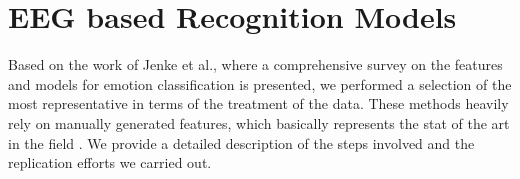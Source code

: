 \documentclass{sig-alternate}
\begin{document}


	

\section{EEG based Recognition Models}
\label{methods}
	
Based on the work of Jenke et al.\cite{jenke2014feature}, where a 
comprehensive survey on  the features and models for emotion 
classification is presented, we performed a selection of the most 
representative in terms of the treatment of the data. These methods 
heavily rely on manually generated features, which basically represents 
the stat of the art in the field \cite{}. We provide a detailed description 
of the steps involved and the replication efforts we carried out. 
\end{document}
